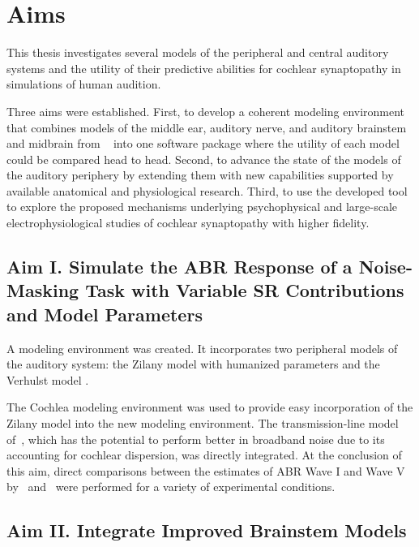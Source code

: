 \chapter{Aims}
\label{chapter:Aims}
\thispagestyle{myheadings}
This thesis investigates several models of the peripheral and central auditory systems and the utility of their predictive abilities for cochlear synaptopathy in simulations of human audition. 

Three aims were established.  First, to develop a coherent modeling environment that combines models of the middle ear, auditory nerve, and auditory brainstem and midbrain from ~\cite{Zilany2014Updated,Verhulst2015Functional,Nelson2004Phenomenological,Carney2015Speech} into one software package where the utility of each model could be compared head to head.  Second, to advance the state of the models of the auditory periphery by extending them with new capabilities supported by available anatomical and physiological research.  Third, to use the developed tool to explore the proposed mechanisms underlying psychophysical and large-scale electrophysiological studies of cochlear synaptopathy with higher fidelity.


\section{Aim I. Simulate the ABR Response of a Noise-Masking Task with Variable SR Contributions and Model Parameters}
A modeling environment was created.  It incorporates two peripheral models of the auditory system: the Zilany model with humanized parameters \citep{Zilany2014Updated} and the Verhulst model \citep{Verhulst2015Functional}.  

The Cochlea modeling environment \citep{Rudnicki2014Cochlea} was used to provide easy incorporation of the Zilany model into the new modeling environment. The transmission-line model of~\cite{Verhulst2015Functional}, which has the potential to perform better in broadband noise due to its  accounting for cochlear dispersion, was directly integrated.
At the conclusion of this aim, direct comparisons between the estimates of ABR Wave I and Wave V by~\cite{Zilany2014Updated} and~\cite{Verhulst2015Functional} were performed for a variety of experimental conditions.

\section{Aim II. Integrate Improved Brainstem Models}  

